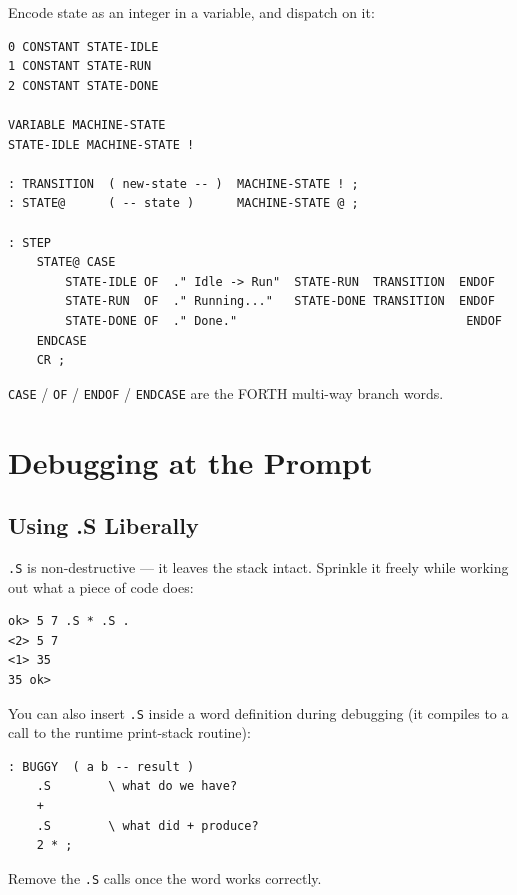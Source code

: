 Encode state as an integer in a variable, and dispatch on it:

\begin{lstlisting}[language=Forth]
0 CONSTANT STATE-IDLE
1 CONSTANT STATE-RUN
2 CONSTANT STATE-DONE

VARIABLE MACHINE-STATE
STATE-IDLE MACHINE-STATE !

: TRANSITION  ( new-state -- )  MACHINE-STATE ! ;
: STATE@      ( -- state )      MACHINE-STATE @ ;

: STEP
    STATE@ CASE
        STATE-IDLE OF  ." Idle -> Run"  STATE-RUN  TRANSITION  ENDOF
        STATE-RUN  OF  ." Running..."   STATE-DONE TRANSITION  ENDOF
        STATE-DONE OF  ." Done."                                ENDOF
    ENDCASE
    CR ;
\end{lstlisting}

\texttt{CASE} / \texttt{OF} / \texttt{ENDOF} / \texttt{ENDCASE} are the
FORTH multi-way branch words.

\chapter{Debugging at the Prompt}
\label{chap:debugging}

\section{Using .S Liberally}
\label{sec:debug-dots}

\texttt{.S} is non-destructive --- it leaves the stack intact. Sprinkle it
freely while working out what a piece of code does:

\begin{lstlisting}[language=Forth]
ok> 5 7 .S * .S .
<2> 5 7
<1> 35
35 ok>
\end{lstlisting}

You can also insert \texttt{.S} inside a word definition during debugging (it
compiles to a call to the runtime print-stack routine):

\begin{lstlisting}[language=Forth]
: BUGGY  ( a b -- result )
    .S        \ what do we have?
    +
    .S        \ what did + produce?
    2 * ;
\end{lstlisting}

Remove the \texttt{.S} calls once the word works correctly.

